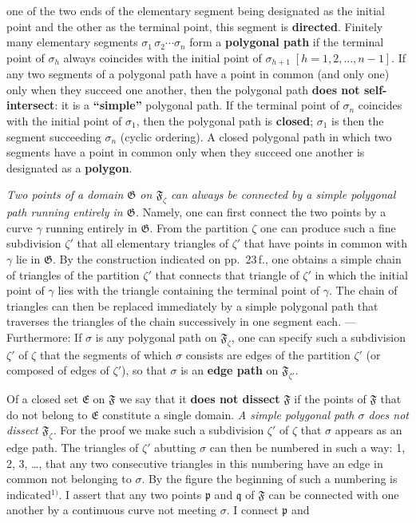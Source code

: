 \documentclass{article}
\begin{document}
one of the two ends of the elementary segment being designated as the initial point and the other as the terminal point, this segment is \textbf{directed}. Finitely many elementary segments $\sigma_1\,\sigma_2 \cdots \sigma_n$ form a \textbf{polygonal path} if the terminal point of $\sigma_h$ always coincides with the initial point of $\sigma_{h+1}\;[h = 1, 2, \dots, n-1]$. If any two segments of a polygonal path have a point in common (and only one) only when they succeed one another, then the polygonal path \textbf{does not self-intersect}: it is a \textbf{``simple''} polygonal path. If the terminal point of $\sigma_n$ coincides with the initial point of $\sigma_1$, then the polygonal path is \textbf{closed}; $\sigma_1$ is then the segment succeeding $\sigma_n$ (cyclic ordering). A closed polygonal path in which two segments have a point in common only when they succeed one another is designated as a \textbf{polygon}.

\emph{Two points of a domain $\mathfrak{G}$ on $\mathfrak{F}_\zeta$ can always be connected by a simple polygonal path running entirely in $\mathfrak{G}$.} Namely, one can first connect the two points by a curve $\gamma$ running entirely in $\mathfrak{G}$. From the partition $\zeta$ one can produce such a fine subdivision $\zeta'$ that all elementary triangles of $\zeta'$ that have points in common with $\gamma$ lie in $\mathfrak{G}$. By the construction indicated on pp.~23\,f., one obtains a simple chain of triangles of the partition $\zeta'$ that connects that triangle of $\zeta'$ in which the initial point of $\gamma$ lies with the triangle containing the terminal point of $\gamma$. The chain of triangles can then be replaced immediately by a simple polygonal path that traverses the triangles of the chain successively in one segment each. --- Furthermore: If $\sigma$ is any polygonal path on $\mathfrak{F}_\zeta$, one can specify such a subdivision $\zeta'$ of $\zeta$ that the segments of which $\sigma$ consists are edges of the partition $\zeta'$ (or composed of edges of $\zeta'$), so that $\sigma$ is an \textbf{edge path} on $\mathfrak{F}_{\zeta'}$.


Of a closed set $\mathfrak{E}$ on $\mathfrak{F}$ we say that it \textbf{does not dissect} $\mathfrak{F}$ if the points of $\mathfrak{F}$ that do not belong to $\mathfrak{E}$ constitute a single domain. \emph{A simple polygonal path $\sigma$ does not dissect $\mathfrak{F}_\zeta$.} For the proof we make such a subdivision $\zeta'$ of $\zeta$ that $\sigma$ appears as an edge path. The triangles of $\zeta'$ abutting $\sigma$ can then be numbered in such a way: 1, 2, 3, \dots, that any two consecutive triangles in this numbering have an edge in common not belonging to $\sigma$. By the figure the beginning of such a numbering is indicated${}^{1)}$. I assert that any two points $\mathfrak{p}$ and $\mathfrak{q}$ of $\mathfrak{F}$ can be connected with one another by a continuous curve not meeting $\sigma$. I connect $\mathfrak{p}$ and
\end{document}
